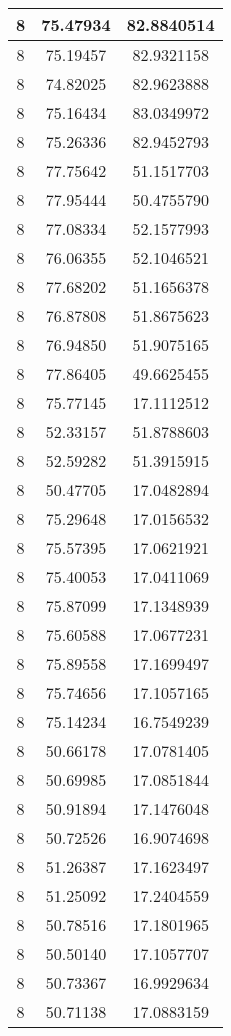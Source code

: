 \documentclass[
]{book}
\begin{document}
\begin{tabular}{c|c|c}
\hline
8 & 75.47934 & 82.8840514\\
\hline
8 & 75.19457 & 82.9321158\\
\hline
8 & 74.82025 & 82.9623888\\
\hline
8 & 75.16434 & 83.0349972\\
\hline
8 & 75.26336 & 82.9452793\\
\hline
8 & 77.75642 & 51.1517703\\
\hline
8 & 77.95444 & 50.4755790\\
\hline
8 & 77.08334 & 52.1577993\\
\hline
8 & 76.06355 & 52.1046521\\
\hline
8 & 77.68202 & 51.1656378\\
\hline
8 & 76.87808 & 51.8675623\\
\hline
8 & 76.94850 & 51.9075165\\
\hline
8 & 77.86405 & 49.6625455\\
\hline
8 & 75.77145 & 17.1112512\\
\hline
8 & 52.33157 & 51.8788603\\
\hline
8 & 52.59282 & 51.3915915\\
\hline
8 & 50.47705 & 17.0482894\\
\hline
8 & 75.29648 & 17.0156532\\
\hline
8 & 75.57395 & 17.0621921\\
\hline
8 & 75.40053 & 17.0411069\\
\hline
8 & 75.87099 & 17.1348939\\
\hline
8 & 75.60588 & 17.0677231\\
\hline
8 & 75.89558 & 17.1699497\\
\hline
8 & 75.74656 & 17.1057165\\
\hline
8 & 75.14234 & 16.7549239\\
\hline
8 & 50.66178 & 17.0781405\\
\hline
8 & 50.69985 & 17.0851844\\
\hline
8 & 50.91894 & 17.1476048\\
\hline
8 & 50.72526 & 16.9074698\\
\hline
8 & 51.26387 & 17.1623497\\
\hline
8 & 51.25092 & 17.2404559\\
\hline
8 & 50.78516 & 17.1801965\\
\hline
8 & 50.50140 & 17.1057707\\
\hline
8 & 50.73367 & 16.9929634\\
\hline
8 & 50.71138 & 17.0883159\\

\end{tabular}
\end{document}
